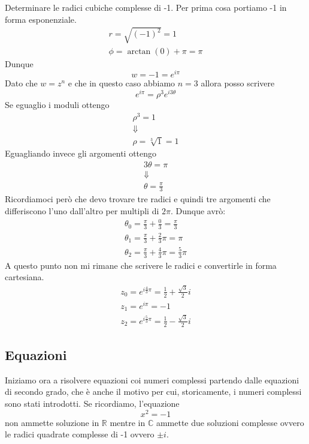 \begin{example}
	Determinare le radici cubiche complesse di -1.
	Per prima cosa portiamo -1 in forma esponenziale.
	\begin{gather*}
		r = \sqrt{(-1)^2} = 1 \\
		\phi = \arctan(0) + \pi = \pi
	\end{gather*}
	Dunque
	\begin{equation*}
		w = -1 = e^{i \pi}
	\end{equation*}
	Dato che $w = z^n$ e che in questo caso abbiamo $n = 3$ allora posso scrivere
	\begin{equation*}
		e^{i \pi} = \rho^3 e^{i 3 \theta}
	\end{equation*}
	Se eguaglio i moduli ottengo
	\begin{gather*}
		\rho^3 = 1 \\
		\Downarrow \\
		\rho = \sqrt[3]{1} = 1
	\end{gather*}
	Eguagliando invece gli argomenti ottengo
	\begin{gather*}
		3 \theta = \pi \\
		\Downarrow     \\
		\theta = \frac{\pi}{3}
	\end{gather*}
	Ricordiamoci per\`o che devo trovare tre radici e quindi tre argomenti che differiscono
	l'uno dall'altro per multipli di $2 \pi$.
	Dunque avr\`o:
	\begin{gather*}
		\theta_0 = \frac{\pi}{3} + \frac{0}{3} = \frac{\pi}{3} \\
		\theta_1 = \frac{\pi}{3} + \frac{2}{3} \pi = \pi       \\
		\theta_2 = \frac{\pi}{3} + \frac{4}{3} \pi = \frac{5}{3} \pi
	\end{gather*}
	A questo punto non mi rimane che scrivere le radici e convertirle in forma cartesiana.
	\begin{gather*}
		z_0 = e^{i \frac{4}{3} \pi} = \frac{1}{2} + \frac{\sqrt{3}}{2} i \\
		z_1 = e^{i \pi} = -1                                             \\
		z_2 = e^{i \frac{5}{3} \pi} = \frac{1}{2} - \frac{\sqrt{3}}{2} i
	\end{gather*}
\end{example}

\subsection{Equazioni}
Iniziamo ora a risolvere equazioni coi numeri complessi partendo dalle equazioni di secondo grado,
che \`e anche il motivo per cui, storicamente, i numeri complessi sono stati introdotti.
Se ricordiamo, l'equazione
\begin{equation*}
	x^2 = -1
\end{equation*}
non ammette soluzione in $\mathbb{R}$ mentre in $\mathbb{C}$ ammette due soluzioni complesse
ovvero le radici quadrate complesse di -1 ovvero $\pm i$.

